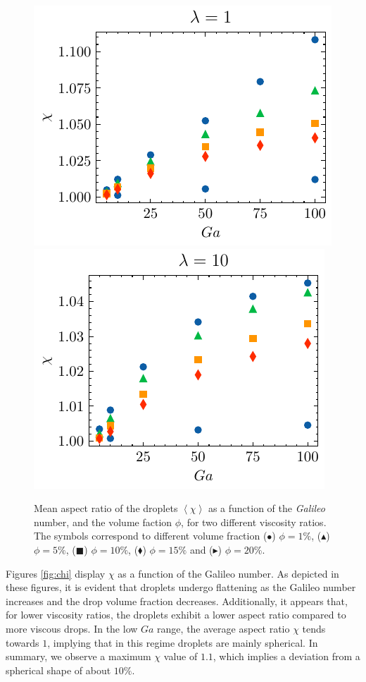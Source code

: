 \documentclass[12pt]{My_preprint}
\newcommand{\avg}[1]{\left<#1\right>}
\renewcommand{\avg}[1]{\left<#1\right>}
\renewcommand{\ref}[1]{\autoref{#1}}
\begin{document}
\begin{figure}[h!]
    \centering
    \includegraphics[height = 0.35\textwidth]{image/HOMOGENEOUS/fPA/chi_mu_r_1-0.pdf}
    \includegraphics[height = 0.35\textwidth]{image/HOMOGENEOUS/fPA/chi_mu_r_0-1.pdf}
    \caption{Mean aspect ratio of the droplets $\avg{\chi}$ as a function of the \textit{Galileo} number, and the volume faction $\phi$,  for two different viscosity ratios.  
    The symbols correspond to different volume fraction ($\bullet$) $\phi = 1\%$, ($\blacktriangle$) $\phi = 5\%$, ($\blacksquare$) $\phi = 10\%$, ($\blacklozenge$) $\phi = 15\%$ and ($\blacktriangleright$) $\phi = 20$\%.
    }
    \label{fig:chi}
\end{figure}



Figures \ref{fig:chi}  display $\chi$ as a function of the Galileo number. %
As depicted in these figures, it is evident that droplets undergo flattening as the Galileo number increases and the drop volume fraction decreases. Additionally, it appears that, for lower viscosity ratios, the droplets exhibit a lower aspect ratio compared to more viscous drops. In the low $Ga$ range, the average aspect ratio $\chi$ tends towards $1$, implying that in this regime droplets are mainly spherical. In summary, we observe a maximum $\chi$ value of $1.1$, which implies a deviation from a spherical shape of about $10 \%$. %
\end{document}
